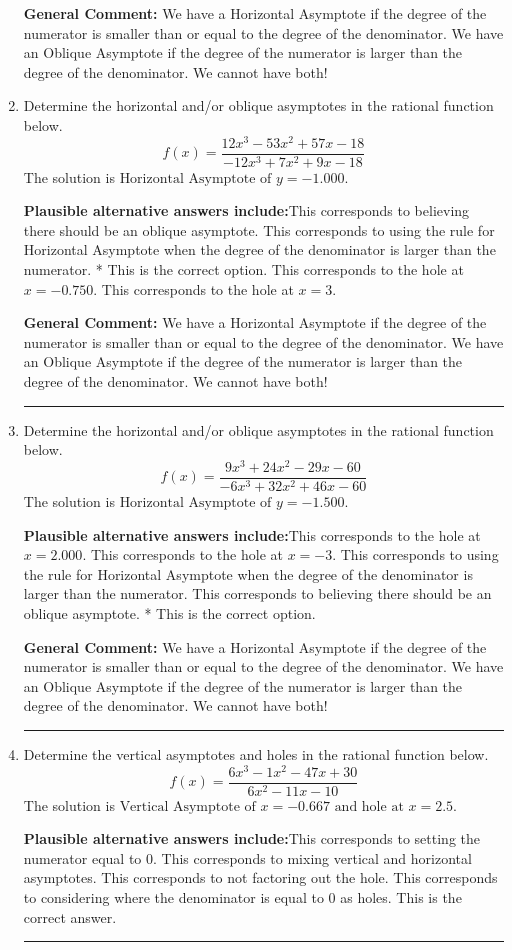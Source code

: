 \documentclass{extbook}[14pt]
\newcommand{\litem}[1]{\item #1

\rule{\textwidth}{0.4pt}}
\begin{document}
\begin{enumerate}
{\textbf{General Comment:} We have a Horizontal Asymptote if the degree of the numerator is smaller than or equal to the degree of the denominator. We have an Oblique Asymptote if the degree of the numerator is larger than the degree of the denominator. We cannot have both!
}
\litem{
Determine the horizontal and/or oblique asymptotes in the rational function below.
\[ f(x) = \frac{12x^{3} -53 x^{2} +57 x -18}{-12x^{3} +7 x^{2} +9 x -18} \]The solution is \( \text{Horizontal Asymptote of } y = -1.000  \).\begin{enumerate}[label=\Alph*.]
\textbf{Plausible alternative answers include:}This corresponds to believing there should be an oblique asymptote.
This corresponds to using the rule for Horizontal Asymptote when the degree of the denominator is larger than the numerator.
* This is the correct option.
This corresponds to the hole at $x = -0.750$.
This corresponds to the hole at $x = 3$.
\end{enumerate}

\textbf{General Comment:} We have a Horizontal Asymptote if the degree of the numerator is smaller than or equal to the degree of the denominator. We have an Oblique Asymptote if the degree of the numerator is larger than the degree of the denominator. We cannot have both!
}
\litem{
Determine the horizontal and/or oblique asymptotes in the rational function below.
\[ f(x) = \frac{9x^{3} +24 x^{2} -29 x -60}{-6x^{3} +32 x^{2} +46 x -60} \]The solution is \( \text{Horizontal Asymptote of } y = -1.500  \).\begin{enumerate}[label=\Alph*.]
\textbf{Plausible alternative answers include:}This corresponds to the hole at $x = 2.000$.
This corresponds to the hole at $x = -3$.
This corresponds to using the rule for Horizontal Asymptote when the degree of the denominator is larger than the numerator.
This corresponds to believing there should be an oblique asymptote.
* This is the correct option.
\end{enumerate}

\textbf{General Comment:} We have a Horizontal Asymptote if the degree of the numerator is smaller than or equal to the degree of the denominator. We have an Oblique Asymptote if the degree of the numerator is larger than the degree of the denominator. We cannot have both!
}
\litem{
Determine the vertical asymptotes and holes in the rational function below.
\[ f(x) = \frac{6x^{3} -1 x^{2} -47 x + 30}{6x^{2} -11 x -10} \]The solution is \( \text{Vertical Asymptote of } x = -0.667 \text{ and hole at } x = 2.5 \).\begin{enumerate}[label=\Alph*.]
\textbf{Plausible alternative answers include:}This corresponds to setting the numerator equal to 0.
This corresponds to mixing vertical and horizontal asymptotes.
This corresponds to not factoring out the hole.
This corresponds to considering where the denominator is equal to 0 as holes.
This is the correct answer.
\end{enumerate}

}
\end{enumerate}
\end{document}
